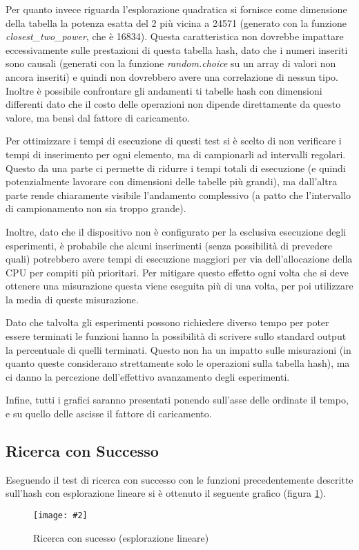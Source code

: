 \documentclass{article}
\newcommand{\image}[3][1]{
	\centering
	\texttt{[image: \#2]}
	\caption{#3}
}
\begin{document}
Per quanto invece riguarda l'esplorazione quadratica si fornisce come dimensione della tabella la potenza esatta del 2 più vicina a 24571 (generato con la funzione \emph{closest\_two\_power}, che è 16834). Questa caratteristica non dovrebbe impattare eccessivamente sulle prestazioni di questa tabella hash, dato che i numeri inseriti sono causali (generati con la funzione \emph{random.choice} su un array di valori non ancora inseriti) e quindi non dovrebbero avere una correlazione di nessun tipo. Inoltre è possibile confrontare gli andamenti ti tabelle hash con dimensioni differenti dato che il costo delle operazioni non dipende direttamente da questo valore, ma bensì dal fattore di caricamento.

Per ottimizzare i tempi di esecuzione di questi test si è scelto di non verificare i tempi di inserimento per ogni elemento, ma di campionarli ad intervalli regolari. Questo da una parte ci permette di ridurre i tempi totali di esecuzione (e quindi potenzialmente lavorare con dimensioni delle tabelle più grandi), ma dall'altra parte rende chiaramente visibile l'andamento complessivo (a patto che l'intervallo di campionamento non sia troppo grande).

Inoltre, dato che il dispositivo non è configurato per la esclusiva esecuzione degli esperimenti, è probabile che alcuni inserimenti (senza possibilità di prevedere quali) potrebbero avere tempi di esecuzione maggiori per via dell'allocazione della CPU per compiti più prioritari. Per mitigare questo effetto ogni volta che si deve ottenere una misurazione questa viene eseguita più di una volta, per poi utilizzare la media di queste misurazione.

Dato che talvolta gli esperimenti possono richiedere diverso tempo per poter essere terminati le funzioni hanno la possibilità di scrivere sullo standard output la percentuale di quelli terminati. Questo non ha un impatto sulle misurazioni (in quanto queste considerano strettamente solo le operazioni sulla tabella hash), ma ci danno la percezione dell'effettivo avanzamento degli esperimenti.

Infine, tutti i grafici saranno presentati ponendo sull'asse delle ordinate il tempo, e su quello delle ascisse il fattore di caricamento.

\subsection{Ricerca con Successo}

Eseguendo il test di ricerca con successo con le funzioni precedentemente descritte sull'hash con esplorazione lineare si è ottenuto il seguente grafico (figura \ref{fig:Successo_Lineare_scala_lineare}).
\begin{figure}[H]
\image[0.75]{Successo_Lineare_scala_lineare}{Ricerca con sucesso (esplorazione lineare)}
\label{fig:Successo_Lineare_scala_lineare}
\end{figure}
\end{document}
